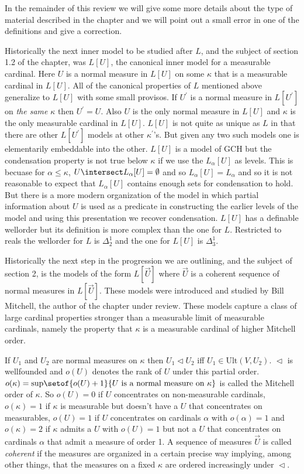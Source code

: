 \documentclass[oneside,12pt]{amsart}
\begin{document}
In the remainder of this review we will give some more details about the type of
material described in the chapter and we will point out a small error in one
of the definitions and give a correction.

Historically the next inner model to be studied after $L$, and the subject
of section 1.2 of the chapter, was $L[U]$, the canonical inner model
for a measurable cardinal. Here $U$ is a normal measure in $L[U]$ on some
$\kappa$ that is a measurable cardinal in $L[U]$. All of the canonical
properties of $L$ mentioned above generalize to $L[U]$ with some small provisos.
If $U^{\prime}$ is a normal measure in $L[U^{\prime}]$ on \emph{the same} $\kappa$
then $U^{\prime}=U$. Also $U$ is the only normal measure in $L[U]$ and $\kappa$ is the
only measurable cardinal in $L[U]$. $L[U]$ is not quite as unique as $L$ in that there
are other $L[U^{\prime}]$ models at other $\kappa^{\prime}$'s. But given any two such models one is
elementarily embeddable into the other. $L[U]$ is a model of GCH but the condensation
property is not true below $\kappa$ if we use the $L_{\alpha}[U]$ as levels.
This is becuase for $\alpha\leq\kappa$, $U\intersect L_{\alpha}[U]=\emptyset$ and
so $L_{\alpha}[U]=L_{\alpha}$ and so it is not reasonable to expect that
$L_{\alpha}[U]$ contains enough sets for condensation to hold. But there is a more
modern organization of the model in which partial information about $U$ is
used as a predicate in constructing the earlier levels of the model and using
this presentation we recover condensation. $L[U]$ has a definable wellorder but its
definition is more complex than the one for $L$. Restricted to reals the wellorder
for $L$ is $\Delta^1_2$ and the one for $L[U]$ is $\Delta^1_3$.

Historically the next step in the progression we are outlining, and the subject
of section 2, is the models of the form
$L[\vec{U}]$ where $\vec{U}$ is a coherent sequence of normal measures in
$L[\vec{U}]$. These models were introduced and studied by Bill Mitchell, the
author of the chapter under review. These models capture a class of large cardinal properties
stronger than a measurable limit of measurable cardinals, namely the property that
$\kappa$ is a measurable cardinal of higher Mitchell order.

If $U_1$ and $U_2$ are normal measures on $\kappa$ then $U_1 \vartriangleleft U_2$ iff
$U_1 \in \text{Ult}(V, U_2)$. $\vartriangleleft$ is wellfounded and $o(U)$ denotes the
rank of $U$ under this partial order. $o(\kappa) = \text{sup}
\setof{o(U) + 1}{U \text{ is a normal measure on } \kappa}$  is called
the Mitchell order of $\kappa$. So  $o(U) = 0$ if $U$
concentrates on non-measurable cardinals, $o(\kappa) = 1$ if $\kappa$ is measurable
but doesn't have a $U$ that concentrates on measurables, $o(U) = 1$ if $U$
concentrates on cardinals $\alpha$ with $o(\alpha) = 1$ and $o(\kappa) = 2$ if
$\kappa$ admits a $U$ with $o(U) = 1$ but not a $U$ that concentrates on cardinals
$\alpha$ that admit a measure of order 1. A sequence of measures $\vec{U}$ is
called \emph{coherent} if the measures are organized in a certain precise way
implying, among other things, that the measures on a fixed $\kappa$ are ordered
increasingly under $\vartriangleleft$.
\end{document}
